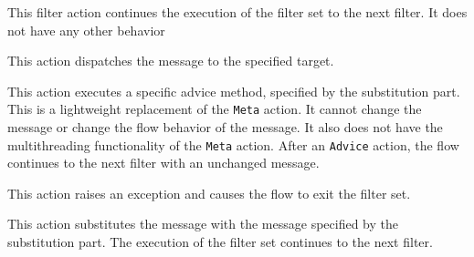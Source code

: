 \begin{description}[style=sameline,leftmargin=28mm]
 \item[Continue] This filter action continues the execution of the filter set to the next filter. It does not have any other behavior
  \item[Dispatch] This action dispatches the message to the specified target.
  \item[Advice] This action executes a specific advice method, specified by the substitution part. This is a lightweight replacement of the \lstinline|Meta| action. It cannot change the message or change the flow behavior of the message. It also does not have the multithreading functionality of the \lstinline|Meta| action. After an \lstinline|Advice| action, the flow continues to the next filter with an unchanged message.
  \item[Error] This action raises an exception and causes the flow to exit the filter set.
  \item[Substitution] This action substitutes the message with the message specified by the substitution part. The execution of the filter set continues to the next filter.
\end{description}

